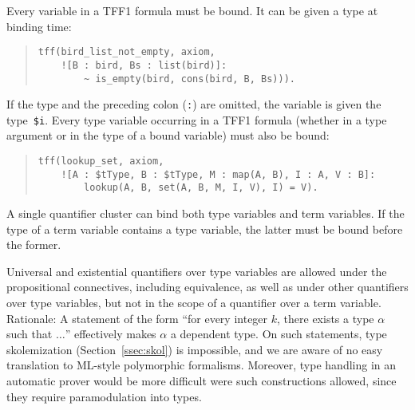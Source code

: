 Every variable in a TFF1 formula must be bound. It can be given a type at
binding time:
\begin{quote}
\begin{verbatim}
tff(bird_list_not_empty, axiom,
    ![B : bird, Bs : list(bird)]:
        ~ is_empty(bird, cons(bird, B, Bs))).
\end{verbatim}
\end{quote}
If the type and the preceding colon ({\tt :}) are omitted, the variable is given
the type~\verb+$i+. Every type variable occurring in a TFF1 formula
(whether in a type argument or in the type of a bound variable)
must also be bound:
\begin{quote}
\begin{verbatim}
tff(lookup_set, axiom,
    ![A : $tType, B : $tType, M : map(A, B), I : A, V : B]:
        lookup(A, B, set(A, B, M, I, V), I) = V).
\end{verbatim}
\end{quote}
A single quantifier cluster can bind both type variables and term variables. If
the type of a term variable contains a type variable, the latter must be bound
before the former.



Universal and existential quantifiers over type variables are allowed under the
propositional connectives, including equivalence, as well as under other
quantifiers over type variables, but not in the scope of a quantifier over a
term variable.
Rationale: A statement of the form ``for every integer $k$, there exists a type
$\alpha$ such that $\ldots$'' effectively makes $\alpha$ a dependent type.
On such statements, type skolemization (Section~\ref{ssec:skol}) is impossible,
and we are aware of no easy translation to ML-style polymorphic formalisms.
Moreover, type handling in an automatic prover would be more difficult were
such constructions allowed, since they require paramodulation into types.

